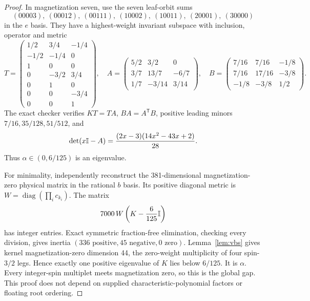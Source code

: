\documentclass[11pt,a4paper]{article}
\theoremstyle{remark}\newtheorem{remark}[theorem]{Remark}
\begin{document}
\begin{proof}
In magnetization seven, use the seven leaf-orbit sums
\[
(00003),\ (00012),\ (00111),\ (10002),\ (10011),\ (20001),\ (30000)
\]
in the $e$ basis. They have a highest-weight invariant subspace with inclusion, operator and metric
\[
 T=\begin{pmatrix}1/2&3/4&-1/4\\-1/2&-1/4&0\\1&0&0\\0&-3/2&3/4\\0&1&0\\0&0&-3/4\\0&0&1\end{pmatrix},\quad
 A=\begin{pmatrix}5/2&3/2&0\\3/7&13/7&-6/7\\1/7&-3/14&3/14\end{pmatrix},\quad
 B=\begin{pmatrix}7/16&7/16&-1/8\\7/16&17/16&-3/8\\-1/8&-3/8&1/2\end{pmatrix}.
\]
The exact checker verifies $KT=TA$, $BA=A^{\mathsf T}B$, positive leading minors $7/16,35/128,51/512$, and
\[
 \det(x\mathbb I-A)=\frac{(2x-3)(14x^2-43x+2)}{28}.
\]
Thus $\alpha\in(0,6/125)$ is an eigenvalue.

For minimality, independently reconstruct the 381-dimensional magnetization-zero physical matrix in the rational $b$ basis. Its positive diagonal metric is $W=\operatorname{diag}(\prod_i c_{k_i})$. The matrix
\[
 7000\,W\left(K-\frac6{125}\mathbb I\right)
\]
has integer entries. Exact symmetric fraction-free elimination, checking every division, gives inertia $(336\text{ positive},45\text{ negative},0\text{ zero})$. Lemma~\ref{lem:vbs} gives kernel magnetization-zero dimension 44, the zero-weight multiplicity of four spin-$3/2$ legs. Hence exactly one positive eigenvalue of $K$ lies below $6/125$. It is $\alpha$. Every integer-spin multiplet meets magnetization zero, so this is the global gap. This proof does not depend on supplied characteristic-polynomial factors or floating root ordering.
\end{proof}
\end{document}
